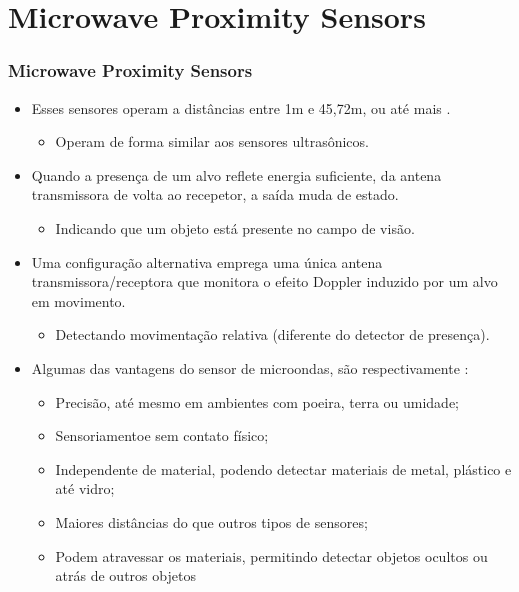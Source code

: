 \documentclass[xcolor=dvipsnames, aspectratio=169]{beamer}
\begin{document}
\section[Microwave Proximity Sensors]{Microwave Proximity Sensors} 
\begin{frame}
\frametitle{Microwave Proximity Sensors}
	\begin{itemize}
		\item Esses sensores operam a distâncias entre 1m e 45,72m, ou até mais \cite{everett1995sensors}.
		\begin{itemize}
			\item Operam de forma similar aos sensores ultrasônicos.
		\end{itemize}
		\item Quando a presença de um alvo reflete energia suficiente, da antena transmissora de volta ao recepetor, a saída muda de estado.
		\begin{itemize}
			\item Indicando que um objeto está presente no campo de visão.
		\end{itemize} 
		\item Uma configuração alternativa emprega uma única antena transmissora/receptora que monitora o efeito Doppler induzido por um alvo em movimento.
		\begin{itemize}
			\item Detectando movimentação relativa (diferente do detector de presença).
		\end{itemize}
		\item Algumas das vantagens do sensor de microondas, são respectivamente \cite{electricitymagnetism2023microwave}:
		\begin{itemize}
			\item Precisão, até mesmo em ambientes com poeira, terra ou umidade;
			\item Sensoriamentoe sem contato físico;
			\item Independente de material, podendo detectar materiais de metal, plástico e até vidro;
			\item Maiores distâncias do que outros tipos de sensores;
			\item Podem atravessar os materiais, permitindo detectar objetos ocultos ou atrás de outros objetos
		\end{itemize}
		

\end{itemize}
\end{frame}
\end{document}
